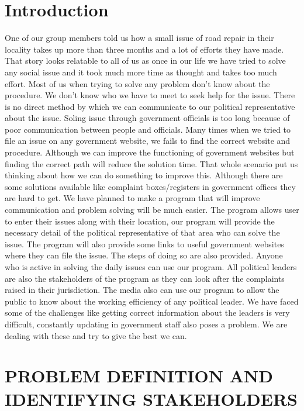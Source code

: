 \documentclass[acmtog]{acmart}
\begin{document}
\section*{Introduction}
One of our group members told us how a small issue of road repair in their locality takes up more than three months and a lot of efforts they have made. That story looks relatable to all of us as once in our life we have tried to solve any social issue and it took much more time as thought and takes too much effort. Most of us when trying to solve any problem don’t know about the procedure. We don’t know who we have to meet to seek help for the issue. There is no direct method by which we can communicate to our political representative about the issue. Soling issue through government officials is too long because of poor communication between people and officials. Many times when we tried to file an issue on any government website, we fails to find the correct website and procedure. Although we can improve the functioning of government websites but finding the correct path will reduce the solution time. That whole scenario put us thinking about how we can do something to improve this. Although there are some solutions available like complaint boxes/registers in government offices they are hard to get. We have planned to make a program that will improve communication and problem solving will be much easier. The program allows user to enter their issues along with their location, our program will provide the necessary detail of the political representative of that area who can solve the issue. The program will also provide some links to useful government websites where they can file the issue. The steps of doing so are also provided. Anyone who is active in solving the daily issues can use our program. All political leaders are also the stakeholders of the program as they can look after the complaints raised in their jurisdiction. The media also can use our program to allow the public to know about the working efficiency of any political leader. We have faced some of the challenges like getting correct information about the leaders is very difficult, constantly updating in government staff also poses a problem. We are dealing with these and try to give the best we can.

\section{PROBLEM DEFINITION AND IDENTIFYING STAKEHOLDERS}
\end{document}
